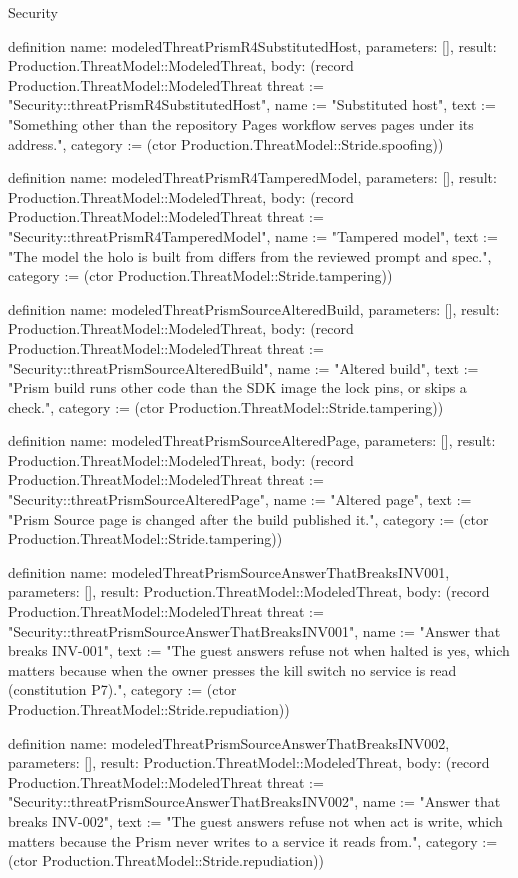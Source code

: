 \begin{lexlean}{Security}
\begin{semanticmodule}
definition{
  name: modeledThreatPrismR4SubstitutedHost,
  parameters: [],
  result: Production.ThreatModel::ModeledThreat,
  body: (record Production.ThreatModel::ModeledThreat {threat := "Security::threatPrismR4SubstitutedHost", name := "Substituted host", text := "Something other than the repository Pages workflow serves pages under its address.", category := (ctor Production.ThreatModel::Stride.spoofing)})
}

definition{
  name: modeledThreatPrismR4TamperedModel,
  parameters: [],
  result: Production.ThreatModel::ModeledThreat,
  body: (record Production.ThreatModel::ModeledThreat {threat := "Security::threatPrismR4TamperedModel", name := "Tampered model", text := "The model the holo is built from differs from the reviewed prompt and spec.", category := (ctor Production.ThreatModel::Stride.tampering)})
}

definition{
  name: modeledThreatPrismSourceAlteredBuild,
  parameters: [],
  result: Production.ThreatModel::ModeledThreat,
  body: (record Production.ThreatModel::ModeledThreat {threat := "Security::threatPrismSourceAlteredBuild", name := "Altered build", text := "Prism build runs other code than the SDK image the lock pins, or skips a check.", category := (ctor Production.ThreatModel::Stride.tampering)})
}

definition{
  name: modeledThreatPrismSourceAlteredPage,
  parameters: [],
  result: Production.ThreatModel::ModeledThreat,
  body: (record Production.ThreatModel::ModeledThreat {threat := "Security::threatPrismSourceAlteredPage", name := "Altered page", text := "Prism Source page is changed after the build published it.", category := (ctor Production.ThreatModel::Stride.tampering)})
}

definition{
  name: modeledThreatPrismSourceAnswerThatBreaksINV001,
  parameters: [],
  result: Production.ThreatModel::ModeledThreat,
  body: (record Production.ThreatModel::ModeledThreat {threat := "Security::threatPrismSourceAnswerThatBreaksINV001", name := "Answer that breaks INV-001", text := "The guest answers refuse not when halted is yes, which matters because when the owner presses the kill switch no service is read (constitution P7).", category := (ctor Production.ThreatModel::Stride.repudiation)})
}

definition{
  name: modeledThreatPrismSourceAnswerThatBreaksINV002,
  parameters: [],
  result: Production.ThreatModel::ModeledThreat,
  body: (record Production.ThreatModel::ModeledThreat {threat := "Security::threatPrismSourceAnswerThatBreaksINV002", name := "Answer that breaks INV-002", text := "The guest answers refuse not when act is write, which matters because the Prism never writes to a service it reads from.", category := (ctor Production.ThreatModel::Stride.repudiation)})
}


\end{semanticmodule}
\end{lexlean}
